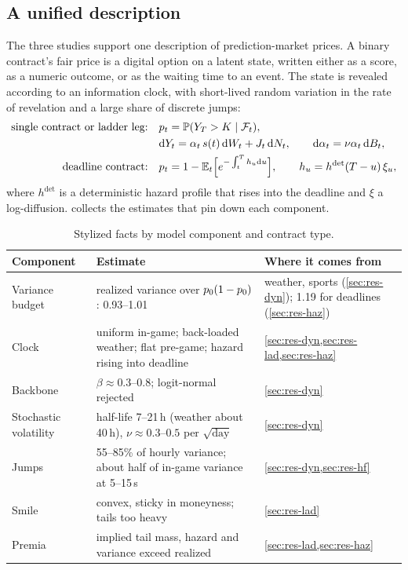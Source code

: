 \subsection{A unified description}

The three studies support one description of prediction-market prices. A binary contract's fair
price is a digital option on a latent state, written either as a score, as a numeric outcome, or as
the waiting time to an event. The state is revealed according to an information clock, with
short-lived random variation in the rate of revelation and a large share of discrete jumps:
\begin{align*}
  \text{single contract or ladder leg:}\quad &p_t=\mathbb{P}(Y_T>K\mid\mathcal{F}_t),\\
  &\mathrm{d} Y_t=\alpha_t\,s(t)\,\mathrm{d} W_t+J_t\,\mathrm{d} N_t,\qquad \mathrm{d}\alpha_t=\nu\alpha_t\,\mathrm{d} B_t,\\
  \text{deadline contract:}\quad &p_t=1-\mathbb{E}_t\Big[e^{-\int_t^T h_u\mathrm{d} u}\Big],\qquad
  h_u=h^{\det}(T-u)\,\xi_u ,
\end{align*}
where $h^{\det}$ is a deterministic hazard profile that rises into the deadline and $\xi$ a
log-diffusion.  collects the estimates that pin down each component.

\begin{table}[t]
\centering
\begin{threeparttable}
\caption{Stylized facts by model component and contract type.}\label{tab:disc-facts}
\small
\begin{tabular}{@{}p{}p{}p{}@{}}
\toprule
Component & Estimate & Where it comes from \\
\midrule
Variance budget & realized variance over $p_0(1-p_0)$: 0.93--1.01 & weather, sports (\cref{sec:res-dyn}); 1.19 for deadlines (\cref{sec:res-haz}) \\
Clock & uniform in-game; back-loaded weather; flat pre-game; hazard rising into deadline & \cref{sec:res-dyn,sec:res-lad,sec:res-haz} \\
Backbone & $\beta\approx0.3$--$0.8$; logit-normal rejected & \cref{sec:res-dyn} \\
Stochastic volatility & half-life 7--21\,h (weather about 40\,h), $\nu\approx0.3$--$0.5$ per $\sqrt{\text{day}}$ & \cref{sec:res-dyn} \\
Jumps & 55--85\% of hourly variance; about half of in-game variance at 5--15\,s & \cref{sec:res-dyn,sec:res-hf} \\
Smile & convex, sticky in moneyness; tails too heavy & \cref{sec:res-lad} \\
Premia & implied tail mass, hazard and variance exceed realized & \cref{sec:res-lad,sec:res-haz} \\
\bottomrule
\end{tabular}
\end{threeparttable}
\end{table}

